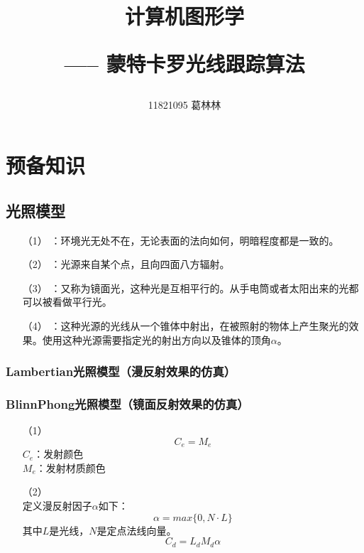 \documentclass[10pt]{article}
\title{计算机图形学 \hspace{2pt}\hspace{2pt} \begin{large}----- \hspace{2pt} 蒙特卡罗光线跟踪算法 \end{large} }
\author{11821095 葛林林}
\begin{document}
\maketitle
\section{预备知识}
\subsection{光照模型}
\begin{itemize}
\item[（1）]{}：环境光无处不在，无论表面的法向如何，明暗程度都是一致的。
\item[（2）]{}：光源来自某个点，且向四面八方辐射。
\item[（3）]{}：又称为镜面光，这种光是互相平行的。从手电筒或者太阳出来的光都可以被看做平行光。
\item[（4）]{}：这种光源的光线从一个锥体中射出，在被照射的物体上产生聚光的效果。使用这种光源需要指定光的射出方向以及锥体的顶角$\alpha$。
\end{itemize}
\subsubsection{Lambertian光照模型（漫反射效果的仿真）}

\subsubsection{BlinnPhong光照模型（镜面反射效果的仿真）}
\begin{itemize}
\item[（1）]{} \mbox{}\\
$$C_{e}=M_{e}$$
$C_e$：发射颜色 \\
$M_e$：发射材质颜色

\item[（2）]{} \mbox{}\\
定义漫反射因子$\alpha$如下：
$$\alpha=max\{0,N \cdot L\}$$
其中$L$是光线，$N$是定点法线向量。
$$C_{d}=L_{d}M_{d}\alpha$$
\end{itemize}
\end{document}
